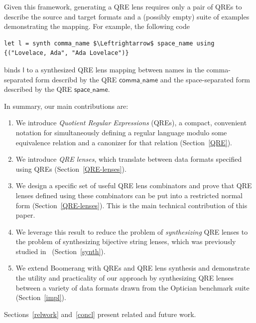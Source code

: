 \documentclass[acmsmall,review,anonymous]{acmart}
\newcommand{\codefont}[1]{\ensuremath{\mathsf{#1}}}
\begin{document}
Given this framework, generating a QRE lens requires only a pair of QREs to
describe the source and target formats and a (possibly empty) suite of examples
demonstrating the mapping.  For example, the following code

\begin{lstlisting}
let l = synth comma_name $\Leftrightarrow$ space_name using {("Lovelace, Ada", "Ada Lovelace")}
\end{lstlisting}
binds \codefont{l} to a synthesized QRE lens mapping between names in the
comma-separated form describd by the QRE \codefont{comma\_name} and the
space-separated form described by the QRE \codefont{space\_name}. 

In summary, our main contributions are:
\begin{enumerate}
  \item We introduce {\em Quotient Regular Expressions} (QREs), 
  a compact, convenient notation for simultaneously defining a
  regular language modulo some equivalence relation and a canonizer
  for that relation (Section~\ref{QRE}).
  \item We introduce {\em QRE lenses}, which translate between data formats
  specified using QREs (Section~\ref{QRE-lenses}).
  \item We design a specific set of useful QRE lens combinators and prove
  that QRE lenses defined using these combinators can be put into a
  restricted normal form (Section~\ref{QRE-lenses}).  This is
  the main technical contribution of this paper.
  \item We leverage this result to reduce the problem of {\em synthesizing} QRE
  lenses to the problem of synthesizing bijective string lenses, which was
  previously studied in~\cite{optician} (Section~\ref{synth}).
  \item We extend Boomerang with QREs and QRE lens synthesis and demonstrate
  the utility and practicality of our approach by synthesizing QRE lenses
  between a variety of data formats drawn from the Optician benchmark suite
  (Section~\ref{impl}).
\end{enumerate}
Sections~\ref{relwork} and~\ref{concl} present related and future work.
\end{document}
